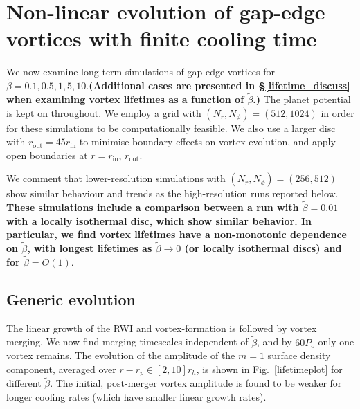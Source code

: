 \section{Non-linear evolution of
  gap-edge vortices with finite cooling time}\label{nonlinear} 
We now examine long-term simulations of gap-edge vortices for
$\tilde{\beta}=0.1,0.5,1,5,10$.{\bf(Additional cases are presented in 
  \S\ref{lifetime_discuss} when examining vortex lifetimes as a
  function of $\tilde{\beta}$.)} The planet potential is kept on
throughout. We employ a grid with $(N_r,N_{\phi})=(512,1024)$ in order
for these 
simulations to be computationally feasible. We also use a larger
disc with $r_{\mathrm{out}}=45r_{\mathrm{in}}$ to minimise boundary
effects on vortex evolution, and apply open boundaries at
$r=r_\mathrm{in},\,r_\mathrm{out}$. 

We comment that lower-resolution simulations with
$(N_r,N_{\phi})=(256,512)$ show similar behaviour and trends as the
high-resolution runs reported below. {\bf These simulations
  include a comparison between a run with $\tilde{\beta}=0.01$ with a 
  locally isothermal disc, which show similar behavior. In particular,
  we find vortex lifetimes have a non-monotonic dependence on
  $\tilde{\beta}$, with longest lifetimes as $\tilde{\beta}\to 0$ (or
  locally isothermal discs) and for $\tilde{\beta} = O(1)$}.     

\subsection{Generic evolution} 
The linear growth of the RWI and vortex-formation is followed by 
vortex merging. We now find merging timescales independent of
$\tilde\beta$, and by $60P_o$ only one vortex remains. 
The evolution of the amplitude of the $m=1$ surface density component,
averaged over $r-r_p\in[2,10]r_h$, is shown in Fig.~\ref{lifetimeplot} 
for different $\tilde\beta$. The initial, post-merger vortex amplitude
is found to be weaker for longer cooling rates (which have smaller 
linear growth rates). 

